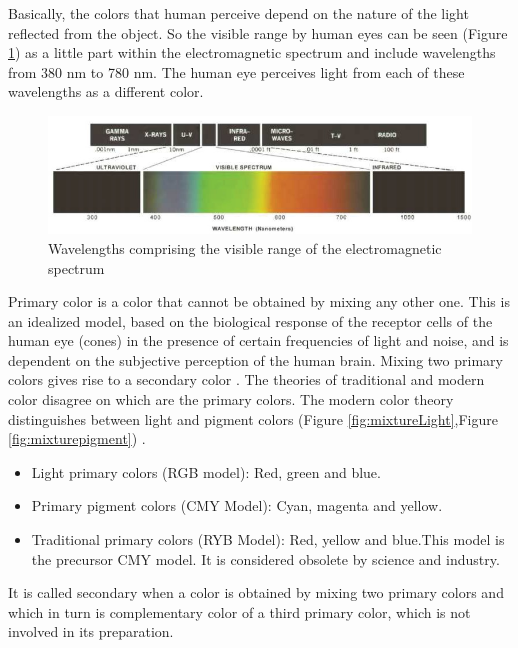 Basically, the colors that human perceive depend on the nature of the light reflected from the object. So the visible range by human eyes can be seen (Figure \ref{fig:wavelength}) as a little part within the electromagnetic spectrum and include wavelengths from 380 nm to 780 nm. The human eye perceives light from each of these wavelengths as a different color\cite{dip1}.


\begin{figure}
  \includegraphics[width=\linewidth]{images/ch2/wavelength.jpg}
  \caption{Wavelengths comprising the visible range of the electromagnetic spectrum}
  \label{fig:wavelength}
\end{figure}

Primary color is a color that cannot be obtained by mixing any other one. This is an idealized model, based on the biological response of the receptor cells of the human eye (cones) in the presence of certain frequencies of light and noise, and is dependent on the subjective perception of the human brain. Mixing two primary colors gives rise to a secondary color \cite{dip1}.
The theories of traditional and modern color disagree on which are the primary colors. The modern color theory distinguishes between light and pigment colors (Figure \ref{fig:mixtureLight},Figure \ref{fig:mixturepigment}) \cite{dip2}.

\begin{itemize}
	\item Light primary colors (RGB model): Red, green and blue.
	\item Primary pigment colors (CMY Model): Cyan, magenta and yellow.
	\item Traditional primary colors (RYB Model): Red, yellow and blue.This model is the precursor CMY model. It is considered obsolete by science and industry.
 
\end{itemize}

It is called secondary when a color is obtained by mixing two primary colors and which in turn is complementary color of a third primary color, which is not involved in its preparation\cite{dip1,dip2}.

